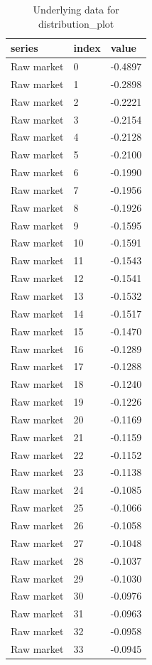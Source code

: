 \begin{table}[htbp]
\centering
\caption{Underlying data for distribution_plot}
\label{tab:distribution_plot_data}
\begin{tabular}{lll}
\toprule
\textbf{series} & \textbf{index} & \textbf{value} \\
\midrule
Raw market & 0 & -0.4897 \\
Raw market & 1 & -0.2898 \\
Raw market & 2 & -0.2221 \\
Raw market & 3 & -0.2154 \\
Raw market & 4 & -0.2128 \\
Raw market & 5 & -0.2100 \\
Raw market & 6 & -0.1990 \\
Raw market & 7 & -0.1956 \\
Raw market & 8 & -0.1926 \\
Raw market & 9 & -0.1595 \\
Raw market & 10 & -0.1591 \\
Raw market & 11 & -0.1543 \\
Raw market & 12 & -0.1541 \\
Raw market & 13 & -0.1532 \\
Raw market & 14 & -0.1517 \\
Raw market & 15 & -0.1470 \\
Raw market & 16 & -0.1289 \\
Raw market & 17 & -0.1288 \\
Raw market & 18 & -0.1240 \\
Raw market & 19 & -0.1226 \\
Raw market & 20 & -0.1169 \\
Raw market & 21 & -0.1159 \\
Raw market & 22 & -0.1152 \\
Raw market & 23 & -0.1138 \\
Raw market & 24 & -0.1085 \\
Raw market & 25 & -0.1066 \\
Raw market & 26 & -0.1058 \\
Raw market & 27 & -0.1048 \\
Raw market & 28 & -0.1037 \\
Raw market & 29 & -0.1030 \\
Raw market & 30 & -0.0976 \\
Raw market & 31 & -0.0963 \\
Raw market & 32 & -0.0958 \\
Raw market & 33 & -0.0945 \\

\end{tabular}
\end{table}
